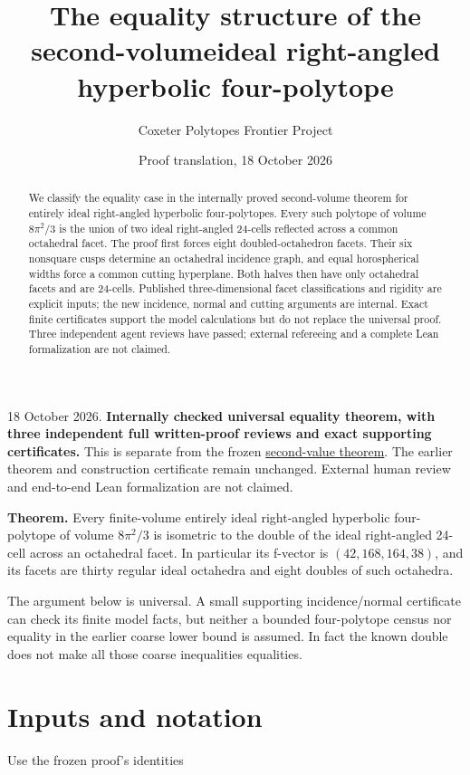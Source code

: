 \documentclass[11pt]{article}
\title{The equality structure of the second-volume\linebreak ideal right-angled hyperbolic four-polytope}
\author{Coxeter Polytopes Frontier Project}
\date{Proof translation, 18 October 2026}
\begin{document}
\maketitle
\begin{abstract}
We classify the equality case in the internally proved second-volume theorem for entirely ideal right-angled hyperbolic four-polytopes. Every such polytope of volume $8\pi^2/3$ is the union of two ideal right-angled 24-cells reflected across a common octahedral facet. The proof first forces eight doubled-octahedron facets. Their six nonsquare cusps determine an octahedral incidence graph, and equal horospherical widths force a common cutting hyperplane. Both halves then have only octahedral facets and are 24-cells. Published three-dimensional facet classifications and rigidity are explicit inputs; the new incidence, normal and cutting arguments are internal. Exact finite certificates support the model calculations but do not replace the universal proof. Three independent agent reviews have passed; external refereeing and a complete Lean formalization are not claimed.
\end{abstract}
18 October 2026. \textbf{Internally checked universal equality theorem, with three independent full written-proof reviews and exact supporting certificates.} This is separate from the frozen \href{ideal_ra4_second_volume_20261018.md}{second-value theorem}. The earlier theorem and construction certificate remain unchanged. External human review and end-to-end Lean formalization are not claimed.

\textbf{Theorem.} Every finite-volume entirely ideal right-angled hyperbolic four-polytope of volume \(8\pi^2/3\) is isometric to the double of the ideal right-angled 24-cell across an octahedral facet. In particular its f-vector is \((42,168,164,38)\), and its facets are thirty regular ideal octahedra and eight doubles of such octahedra.

The argument below is universal. A small supporting incidence/normal certificate can check its finite model facts, but neither a bounded four-polytope census nor equality in the earlier coarse lower bound is assumed. In fact the known double does not make all those coarse inequalities equalities.

\section{Inputs and notation}\label{inputs-and-notation}

Use the frozen proof's identities
\end{document}
